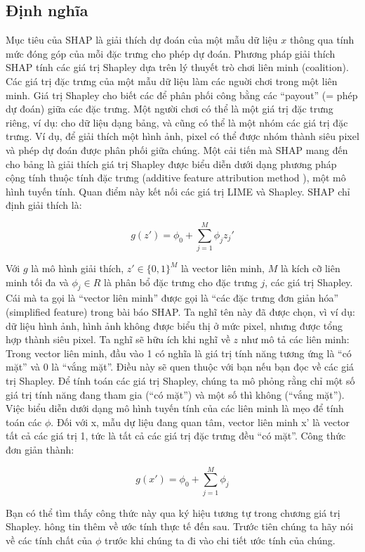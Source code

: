 \subsection{Định nghĩa}
Mục tiêu của SHAP là giải thích dự đoán của một mẫu dữ liệu $x$ thông qua tính mức đóng góp của mỗi đặc trưng cho phép dự đoán. Phương pháp giải thích SHAP tính các giá trị Shapley dựa trên lý thuyết trò chơi liên minh (coalition). Các giá trị đặc trưng của một mẫu dữ liệu làm các nguời chơi trong một liên minh. Giá trị Shapley cho biết các để phân phối công bằng các “payout” (= phép dự đoán) giữa các đặc trưng. Một người chơi có thể là một giá trị đặc trưng riêng, ví dụ: cho dữ liệu dạng bảng, và cũng có thể là một nhóm các giá trị đặc trưng. Ví dụ, để giải thích một hình ảnh, pixel có thể được nhóm thành siêu pixel và phép dự đoán được phân phối giữa chúng. Một cải tiến mà SHAP mang đến cho bảng là giải thích giá trị Shapley được biểu diễn dưới dạng phương pháp cộng tính thuộc tính đặc trưng (additive feature attribution method
), một mô hình tuyến tính. Quan điểm này kết nối các giá trị LIME và Shapley. SHAP chỉ định giải thích là:

$$g(z')=\phi_0+\sum_{j=1}^M\phi_jz_j'$$


Với $g$ là mô hình giải thích, $z' \in \{0, 1\}^M$ là vector liên minh, $M$ là kích cỡ liên minh tối đa và $\phi_j \in R$ là phân bổ đặc trưng cho đặc trưng $j$, các giá trị Shapley.  Cái mà ta gọi là ``vector liên minh'' được gọi là ``các đặc trưng đơn giản hóa'' (simplified feature) trong bài báo SHAP. Ta nghĩ tên này đã được chọn, vì ví dụ: dữ liệu hình ảnh, hình ảnh không được biểu thị ở mức pixel, nhưng được tổng hợp thành siêu pixel. Ta nghĩ sẽ hữu ích khi nghĩ về $z$ như mô tả các liên minh: Trong vector liên minh, đầu vào 1 có nghĩa là giá trị tính năng tương ứng là ``có mặt'' và 0 là ``vắng mặt''. Điều này sẽ quen thuộc với bạn nếu bạn đọc về các giá trị Shapley. Để tính toán các giá trị Shapley, chúng ta mô phỏng rằng chỉ một số giá trị tính năng đang tham gia (``có mặt'') và một số thì không (``vắng mặt''). Việc biểu diễn dưới dạng mô hình tuyến tính của các liên minh là mẹo để tính toán các $\phi$. Đối với x, mẫu dự liệu đang quan tâm, vector liên minh x' là vector tất cả các giá trị 1, tức là tất cả các giá trị đặc trưng đều ``có mặt''. Công thức đơn giản thành:

$$g(x')=\phi_0+\sum_{j=1}^M\phi_j$$

Bạn có thể tìm thấy công thức này qua ký hiệu tương tự trong chương giá trị Shapley. hông tin thêm về ước tính thực tế đến sau. Trước tiên chúng ta hãy nói về các tính chất của $\phi$ trước khi chúng ta đi vào chi tiết ước tính của chúng.

